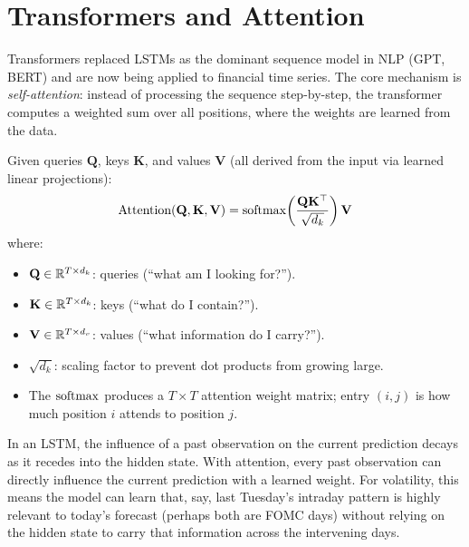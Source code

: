 \section{Transformers and Attention}\label{sec:dl:transformers}

Transformers replaced LSTMs as the dominant sequence model in NLP (GPT, BERT) and are now being applied to financial time series.
The core mechanism is \emph{self-attention}: instead of processing the sequence step-by-step, the transformer computes a weighted sum over all positions, where the weights are learned from the data.

\begin{definition}
Given queries $\mathbf{Q}$, keys $\mathbf{K}$, and values $\mathbf{V}$ (all derived from the input via learned linear projections):
\begin{equation}\label{eq:attention}
  \text{Attention}(\mathbf{Q}, \mathbf{K}, \mathbf{V})
  = \operatorname{softmax}\!\left(\frac{\mathbf{Q}\mathbf{K}^\top}{\sqrt{d_k}}\right) \mathbf{V}
\end{equation}
where:
\begin{itemize}[nosep]
  \item $\mathbf{Q} \in \mathbb{R}^{T \times d_k}$: queries (``what am I looking for?'').
  \item $\mathbf{K} \in \mathbb{R}^{T \times d_k}$: keys (``what do I contain?'').
  \item $\mathbf{V} \in \mathbb{R}^{T \times d_v}$: values (``what information do I carry?'').
  \item $\sqrt{d_k}$: scaling factor to prevent dot products from growing large.
  \item The $\operatorname{softmax}$ produces a $T \times T$ attention weight matrix; entry $(i, j)$ is how much position $i$ attends to position $j$.
\end{itemize}
\end{definition}

\begin{intuition}
In an LSTM, the influence of a past observation on the current prediction decays as it recedes into the hidden state.
With attention, every past observation can directly influence the current prediction with a learned weight.
For volatility, this means the model can learn that, say, last Tuesday's intraday pattern is highly relevant to today's forecast (perhaps both are FOMC days) without relying on the hidden state to carry that information across the intervening days.
\end{intuition}

